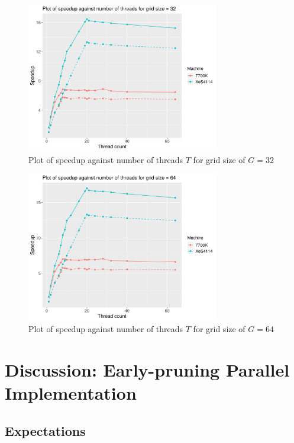 \documentclass[12pt]{article}
\begin{document}
\begin{figure}[H]
    \centering
    \includegraphics[width=0.75\textwidth]{./extraProcessedResults/optPar-gridSize32-speedup}
    \caption{Plot of speedup against number of threads $T$ for grid size of $G = 32$}
    \label{fig:optPar-gridSize32-speedup}
\end{figure}
\begin{figure}[H]
    \centering
    \includegraphics[width=0.75\textwidth]{./extraProcessedResults/optPar-gridSize64-speedup}
    \caption{Plot of speedup against number of threads $T$ for grid size of $G = 64$}
    \label{fig:optPar-gridSize64-speedup}
\end{figure}
\pagebreak

\section{Discussion: Early-pruning Parallel Implementation}

\subsection{Expectations}
\end{document}
